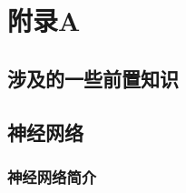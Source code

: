 \documentclass[12pt,a4paper,titlepage]{article}
\begin{document}
\newpage
\renewcommand\refname{\zihao{-2} 参考文献}


\newpage
\section*{附录A}

\subsection*{涉及的一些前置知识}


\subsection*{神经网络}
\subsubsection*{神经网络简介}
\end{document}
